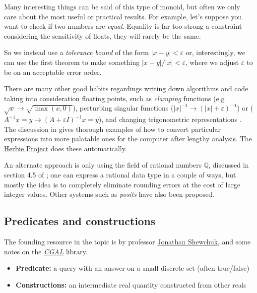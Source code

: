 Many interesting things can be said of this type of monoid, but often
we only care about the most useful or practical results. For example,
let's suppose you want to check if two numbers are \emph{equal}. Equality
is far too strong a constraint considering the sensitivity of floats, they will
rarely be the same.

\spa

So we instead use a \emph{tolerance bound} of the form $|x-y|<\varepsilon$
or, interestingly, we can use the first theorem to make something
$|x-y|/|x| < \varepsilon$, where we adjust $\varepsilon$ to be on
an acceptable error order.

\spa

There are many other good habits regardings writing down algorithms
and code taking into consideration floating points, such as
\emph{clamping} functions (e.g $\sqrt{x} \rightarrow \sqrt{\max(x,0)}$),
perturbing singular functions 
($|x|^{-1} \rightarrow (|x| + \varepsilon)^{-1}$) or
($A^{-1}x=y \rightarrow (A+\varepsilon I)^{-1}x=y$),
and changing trigonometric representations \cite{float3}.
The discussion in \cite{float2} gives thorough examples of how
to convert particular expressions into more palatable ones for the
computer after lengthy analysis. The 
\href{https://herbie.uwplse.org/demo/}{Herbie Project} does these
automatically.

\spa

An alternate approach is only using the field of rational numbers
$\mathbb{Q}$, discussed in section 4.5 of \cite{artof1}; 
one can express a rational data type in a couple of ways,
but mostly the idea is to completely eliminate rounding errors at the
cost of large integer values. Other systems such as
\emph{posits} \cite{posit} have also been proposed.

\subsection{Predicates and constructions}

The founding resource in the topic is \cite{predicate1} by professor
\href{http://people.eecs.berkeley.edu/~jrs/}{Jonathan  Shewchuk},
and some notes on the 
\href{https://doc.cgal.org/Manual/3.1/doc_html/cgal_manual/Kernel_23/Chapter_predicates_constructions.html}{\emph{CGAL}} library.

\begin{itemize}
    \item \textbf{Predicate:} a query with an answer on a small
    discrete set (often true/false)

    \item \textbf{Constructions:} an intermediate real quantity
    constructed from other reals
\end{itemize}

